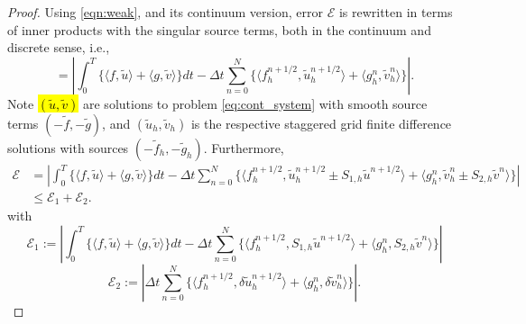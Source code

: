 \begin{proof}
Using \ref{eqn:weak}, and its continuum version, error $\mathcal E$ is rewritten in terms of inner products with the singular source terms, both in the continuum and discrete sense, i.e.,
\[
	\mathcal = \left| \int_0^T  \Big\{ \langle f,\tilde u \rangle + \langle g,\tilde v\rangle \Big\} dt -
		\Delta t \sum_{n=0}^N \Big\{ \langle f_h^{n+1/2}, \tilde u_h^{n+1/2} \rangle +
						 	   \langle g_h^{n}, \tilde v_h^{n}  \rangle \Big\} \right|.
\]
Note \hl{$(\tilde u,\tilde v)$} are solutions to problem \ref{eq:cont_system} with smooth source terms 
$(-\tilde f,-\tilde g)$, and $(\tilde u_h,\tilde v_h)$ is the respective staggered grid finite difference solutions with sources $(-\tilde f_h,-\tilde g_h)$.
Furthermore,
\begin{equation*}
\begin{split}
\mathcal E &= \left| \int_0^T  \Big\{ \langle f,\tilde u \rangle + \langle g,\tilde v\rangle \Big\} dt -
		\Delta t \sum_{n=0}^N \Big\{ \langle f_h^{n+1/2}, \tilde u_h^{n+1/2} \pm S_{1,h}\tilde u^{n+1/2} \rangle +
						 	   \langle g_h^{n}, \tilde v_h^{n} \pm S_{2,h}\tilde v^{n} \rangle \Big\} \right|\\
	& \le \mathcal E_1 + \mathcal E_2.
\end{split}
\end{equation*}
with
\[
\mathcal E_1 := \left|  \int_0^T  \Big\{ \langle f,\tilde u \rangle + \langle g,\tilde v\rangle \Big\} dt
			-\Delta t \sum_{n=0}^{N} \Big\{  \langle f_h^{n+1/2}, S_{1,h}\tilde u^{n+1/2} \rangle +
			\langle g_h^n, S_{2,h} \tilde v^{n} \rangle \Big\} \right|
\]
\[
\mathcal E_2 := \left| \Delta t \sum_{n=0}^N \Big\{ \langle f_h^{n+1/2}, \delta \tilde u_h^{n+1/2} \rangle +
			\langle g_h^n, \delta \tilde v_h^n \rangle \Big\} \right|.
\]


\end{proof}
